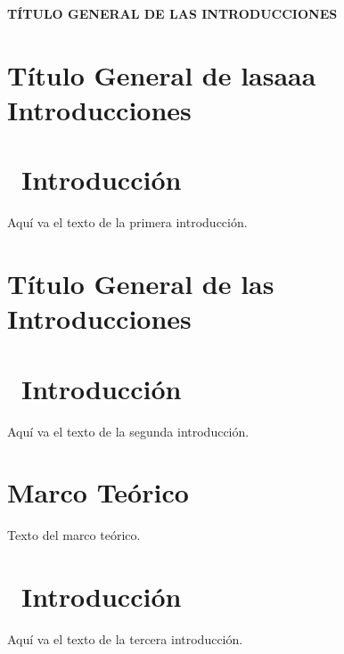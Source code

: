 \documentclass[12pt,a4paper]{article}
\newcounter{intro}
\begin{document}
	
	\begin{center}
		\textbf{ TÍTULO GENERAL DE LAS INTRODUCCIONES}
	\end{center}
	
	\section*{Título General de lasaaa Introducciones}
	
	
	\section*{\theintro\ Introducción}
	Aquí va el texto de la primera introducción.
	
	
	\section*{Título General de las Introducciones}
	
	\section*{\theintro\ Introducción}
	Aquí va el texto de la segunda introducción.
	
	\section{Marco Teórico}
	Texto del marco teórico.
	
	\section*{\theintro\ Introducción}
	Aquí va el texto de la tercera introducción.
	
\end{document}
